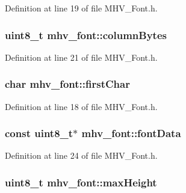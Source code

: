 \-Definition at line 19 of file \-M\-H\-V\-\_\-\-Font.\-h.

\hypertarget{structmhv__font_aee0716d7afae1a161ddab7859aebeb6b}{
\subsubsection[{column\-Bytes}]{\setlength{\rightskip}{0pt plus 5cm}uint8\-\_\-t {\bf mhv\-\_\-font\-::column\-Bytes}}}
\label{structmhv__font_aee0716d7afae1a161ddab7859aebeb6b}


\-Definition at line 21 of file \-M\-H\-V\-\_\-\-Font.\-h.

\hypertarget{structmhv__font_a675ce1bde33e6b62a4aff2ba955e61c7}{
\subsubsection[{first\-Char}]{\setlength{\rightskip}{0pt plus 5cm}char {\bf mhv\-\_\-font\-::first\-Char}}}
\label{structmhv__font_a675ce1bde33e6b62a4aff2ba955e61c7}


\-Definition at line 18 of file \-M\-H\-V\-\_\-\-Font.\-h.

\hypertarget{structmhv__font_a2143c1f24a538699b21c26a0e848061e}{
\subsubsection[{font\-Data}]{\setlength{\rightskip}{0pt plus 5cm}const uint8\-\_\-t$\ast$ {\bf mhv\-\_\-font\-::font\-Data}}}
\label{structmhv__font_a2143c1f24a538699b21c26a0e848061e}


\-Definition at line 24 of file \-M\-H\-V\-\_\-\-Font.\-h.

\hypertarget{structmhv__font_aa15b52666692c10a27f9b5fcbed78780}{
\subsubsection[{max\-Height}]{\setlength{\rightskip}{0pt plus 5cm}uint8\-\_\-t {\bf mhv\-\_\-font\-::max\-Height}}}
\label{structmhv__font_aa15b52666692c10a27f9b5fcbed78780}


